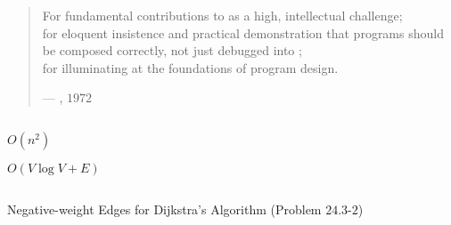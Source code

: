 
\begin{frame}{}

  \begin{quote}
    {\small
      For fundamental contributions to  as a high, intellectual challenge; \\[3pt]
      for eloquent insistence and practical demonstration that programs should be composed correctly,
      not just debugged into ; \\[3pt]
      for illuminating  at the foundations of program design.
    }

    \hfill --- , $1972$
  \end{quote}
\end{frame}

\begin{frame}[fragile]
  \begin{columns}
      
  \end{columns}

  \pause
  \vspace{0.50cm}
  \begin{columns}
      \begin{description}
	\item[Array:] $O(n^2)$
	\item[Min-heap:] 
	\item[Fib-heap:] $O(V \log V + E)$
      \end{description}
  \end{columns}
\end{frame}

\begin{frame}{}
\end{frame}

\begin{frame}{}
  \begin{exampleblock}{Negative-weight Edges for Dijkstra's Algorithm (Problem $24.3$-$2$)}
  \end{exampleblock}
\end{frame}

